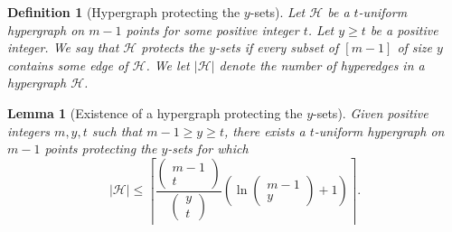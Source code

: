 \documentclass{article}
\newcounter{main}[section]
\newtheorem{definition}[main]{Definition}
\newtheorem{lemma}[main]{Lemma}
\begin{document}
\begin{definition}[Hypergraph protecting the $y$-sets]\label{def:hypergraph_protecting_y_sets}
    Let $\mathcal{H}$ be a $t$-uniform hypergraph on $m-1$ points for some positive integer $t$. Let $y\geq t$ be a positive integer. We say that $\mathcal{H}$ \textit{protects the $y$-sets} if every subset of $[m-1]$ of size $y$ contains some edge of $\mathcal{H}$. We let $|\mathcal{H}|$ denote the number of hyperedges in a hypergraph $\mathcal{H}$.
\end{definition}
\begin{lemma}[Existence of a hypergraph protecting the $y$-sets]\label{lem:hypergraph_existence}
    Given positive integers $m,y,t$ such that $m-1 \geq y \geq t$, there exists a $t$-uniform hypergraph on $m-1$ points protecting the $y$-sets for which
    \begin{equation}
        |\mathcal{H}| \leq\left\lceil\frac{\begin{pmatrix}
            m-1\\t
        \end{pmatrix}}{\begin{pmatrix}
            y\\t
        \end{pmatrix}}\left(\ln\begin{pmatrix}
            m-1\\y
        \end{pmatrix}+1\right)\right\rceil.
    \end{equation}
\end{lemma}
\end{document}
